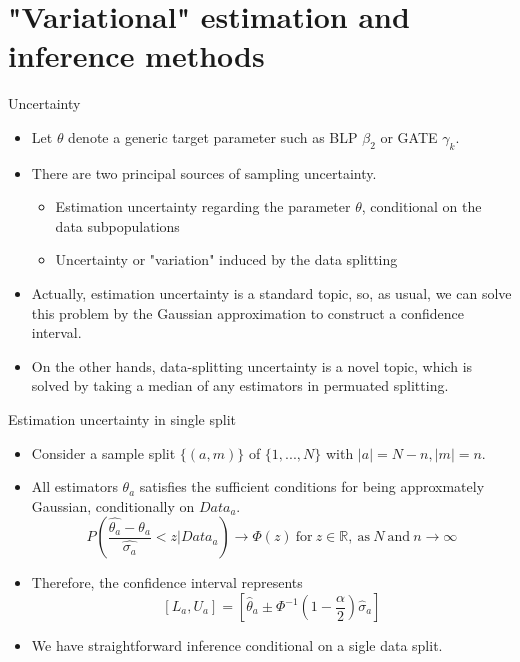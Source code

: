 \documentclass[xcolor=svgnames,aspectratio=169]{beamer}
\newcommand{\R}{\mathbb{R}}
\begin{document}
\section{"Variational" estimation and inference methods}

\begin{frame}{Uncertainty}
    \begin{itemize}
        \item Let $\theta$ denote a generic target parameter such as BLP $\beta_2$ or GATE $\gamma_k$.
        \item There are two principal sources of sampling uncertainty.
        \begin{itemize}
            \item \alert{Estimation uncertainty} regarding the parameter $\theta$, conditional on the data subpopulations
            \item Uncertainty or "variation" \alert{induced by the data splitting}
        \end{itemize}
        \item Actually, estimation uncertainty is a standard topic, so, as usual, we can solve this problem by the \alert{Gaussian approximation} to construct a confidence interval.
        \item On the other hands, data-splitting uncertainty is a novel topic, which is solved by taking a \alert{median} of any estimators in permuated splitting. 
    \end{itemize}
\end{frame}

\begin{frame}{Estimation uncertainty in single split}
    \begin{itemize}
        \item Consider a sample split $\{(a,m)\}$ of $\{1,...,N\}$ with $|a|=N-n, |m|=n$.
        \item All estimators $\theta_a$ satisfies the sufficient conditions for being approxmately Gaussian, conditionally on $Data_a$.
        \[
        P(\frac{\hat{\theta_a}-\theta_a}{\hat{\sigma_a}}<z|Data_a) \to \Phi(z) \ \text{for} \ z\in\R, \ \text{as} \ N \ \text{and} \ n\to\infty
        \]
        \item Therefore, the confidence interval represents
        \[
        [L_a, U_a]=[\hat{\theta}_a\pm \Phi^{-1}(1-\frac{\alpha}{2})\hat{\sigma}_a]
        \]
        \item We have straightforward inference conditional on a sigle data split.
    \end{itemize}
\end{frame}
\end{document}
